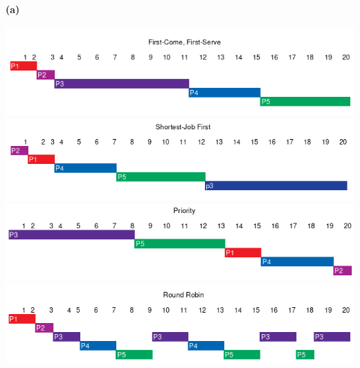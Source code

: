 \documentclass[12pt]{jhwhw}
\begin{document}
	\textbf{(a)} \\
	\begin{centering}
	\includegraphics[scale=0.65]{fcfs.png} \\
	\includegraphics[scale=0.65]{sjf.png} \\
	\includegraphics[scale=0.65]{prio.png} \\
	\includegraphics[scale=0.65]{rr.png} \\
	\end{centering}
	\clearpage
\end{document}
